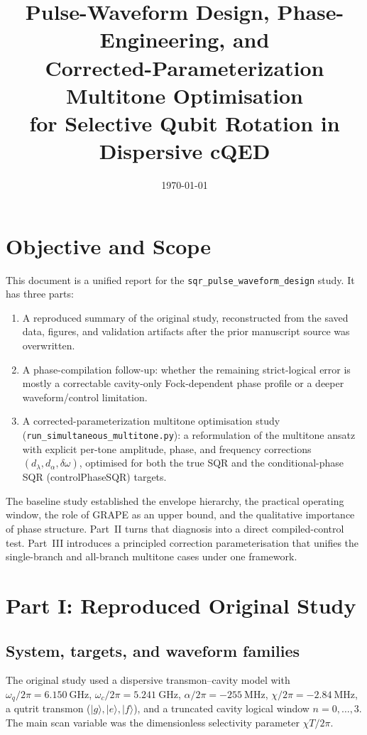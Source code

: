 \documentclass[11pt]{article}
\title{Pulse-Waveform Design, Phase-Engineering, and\\
Corrected-Parameterization Multitone Optimisation\\
for Selective Qubit Rotation in Dispersive cQED}
\author{}
\date{\today}
\begin{document}
\maketitle

\section{Objective and Scope}

This document is a unified report for the
\texttt{sqr\_pulse\_waveform\_design} study. It has three parts:

\begin{enumerate}[label=\arabic*.]
    \item A reproduced summary of the original study, reconstructed from the
    saved data, figures, and validation artifacts after the prior manuscript
    source was overwritten.
    \item A phase-compilation follow-up: whether the remaining strict-logical
    error is mostly a correctable cavity-only Fock-dependent phase profile or a
    deeper waveform/control limitation.
    \item A corrected-parameterization multitone optimisation study
    (\texttt{run\_simultaneous\_multitone.py}): a reformulation of the multitone
    ansatz with explicit per-tone amplitude, phase, and frequency corrections
    $(d_\lambda, d_\alpha, \delta\omega)$, optimised for both the true SQR and
    the conditional-phase SQR (controlPhaseSQR) targets.
\end{enumerate}

The baseline study established the envelope hierarchy, the practical operating
window, the role of GRAPE as an upper bound, and the qualitative importance of
phase structure. Part~II turns that diagnosis into a direct compiled-control
test. Part~III introduces a principled correction parameterisation that unifies
the single-branch and all-branch multitone cases under one framework.

\section{Part I: Reproduced Original Study}

\subsection{System, targets, and waveform families}

The original study used a dispersive transmon--cavity model with
$\omega_q/2\pi = \SI{6.150}{\giga\hertz}$,
$\omega_c/2\pi = \SI{5.241}{\giga\hertz}$,
$\alpha/2\pi = \SI{-255}{\mega\hertz}$,
$\chi/2\pi = \SI{-2.84}{\mega\hertz}$, a qutrit transmon
($|g\rangle, |e\rangle, |f\rangle$), and a truncated cavity logical window
$n=0,\dots,3$. The main scan variable was the dimensionless selectivity
parameter $\chi T / 2\pi$.
\end{document}
